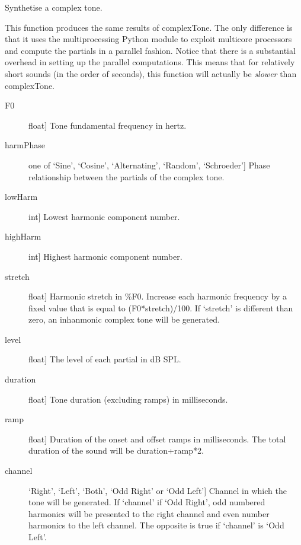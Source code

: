 \documentclass[letterpaper,10pt,english]{sphinxmanual}
\begin{document}
\begin{fulllineitems}
\label{index:sndlib.complexToneParallel}
Synthetise a complex tone.

This function produces the same results of complexTone. The only difference
is that it uses the multiprocessing Python module to exploit multicore
processors and compute the partials in a parallel fashion. Notice that
there is a substantial overhead in setting up the parallel computations.
This means that for relatively short sounds (in the order of seconds),
this function will actually be \emph{slower} than complexTone.
\begin{description}
\item[{F0}] \leavevmode{[}float{]}
Tone fundamental frequency in hertz.

\item[{harmPhase}] \leavevmode{[}one of `Sine', `Cosine', `Alternating', `Random', `Schroeder'{]}
Phase relationship between the partials of the complex tone.

\item[{lowHarm}] \leavevmode{[}int{]}
Lowest harmonic component number.

\item[{highHarm}] \leavevmode{[}int{]}
Highest harmonic component number.

\item[{stretch}] \leavevmode{[}float{]}
Harmonic stretch in \%F0. Increase each harmonic frequency by a fixed value
that is equal to (F0*stretch)/100. If `stretch' is different than
zero, an inhanmonic complex tone will be generated.

\item[{level}] \leavevmode{[}float{]}
The level of each partial in dB SPL.

\item[{duration}] \leavevmode{[}float{]}
Tone duration (excluding ramps) in milliseconds.

\item[{ramp}] \leavevmode{[}float{]}
Duration of the onset and offset ramps in milliseconds.
The total duration of the sound will be duration+ramp*2.

\item[{channel}] \leavevmode{[}`Right', `Left', `Both', `Odd Right' or `Odd Left'{]}
Channel in which the tone will be generated. If `channel'
if `Odd Right', odd numbered harmonics will be presented
to the right channel and even number harmonics to the left
channel. The opposite is true if `channel' is `Odd Left'.


\end{description}
\end{fulllineitems}
\end{document}

